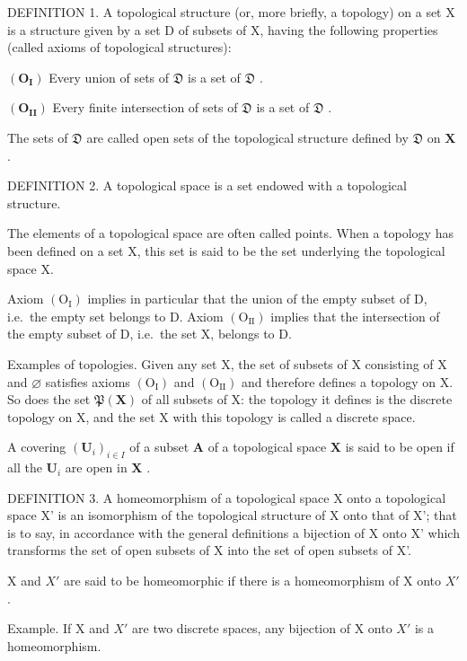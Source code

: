 DEFINITION 1. A topological structure (or, more briefly, a topology) on a set X is a structure given by a set D of subsets of X, having the following properties (called axioms of topological structures):

\((\mathbf{O}_{\mathbf{I}})\) Every union of sets of \(\mathfrak{D}\) is a set of \(\mathfrak{D}\) .

\((\mathbf{O}_{\mathbf{II}})\) Every finite intersection of sets of \(\mathfrak{D}\) is a set of \(\mathfrak{D}\) .

The sets of \(\mathfrak{D}\) are called open sets of the topological structure defined by \(\mathfrak{D}\) on \(\mathbf{X}\) .

DEFINITION 2. A topological space is a set endowed with a topological structure.

The elements of a topological space are often called points. When a topology has been defined on a set X, this set is said to be the set underlying the topological space X.

Axiom \((\mathrm{O}_{\mathrm{I}})\) implies in particular that the union of the empty subset of D, i.e.~the empty set belongs to D. Axiom \((\mathrm{O}_{\mathrm{II}})\) implies that the intersection of the empty subset of D, i.e.~the set X, belongs to D.

Examples of topologies. Given any set X, the set of subsets of X consisting of X and \(\varnothing\) satisfies axioms \((\mathrm{O}_{\mathrm{I}})\) and \((\mathrm{O}_{\mathrm{II}})\) and therefore defines a topology on X. So does the set \(\mathfrak{P}(\mathbf{X})\) of all subsets of X: the topology it defines is the discrete topology on X, and the set X with this topology is called a discrete space.

A covering \((\mathbf{U}_i)_{i\in I}\) of a subset \(\mathbf{A}\) of a topological space \(\mathbf{X}\) is said to be open if all the \(\mathbf{U}_i\) are open in \(\mathbf{X}\) .

DEFINITION 3. A homeomorphism of a topological space X onto a topological space X' is an isomorphism of the topological structure of X onto that of X'; that is to say, in accordance with the general definitions a bijection of X onto X' which transforms the set of open subsets of X into the set of open subsets of X'.

X and \(X'\) are said to be homeomorphic if there is a homeomorphism of X onto \(X'\) .

Example. If X and \(X'\) are two discrete spaces, any bijection of X onto \(X'\) is a homeomorphism.


